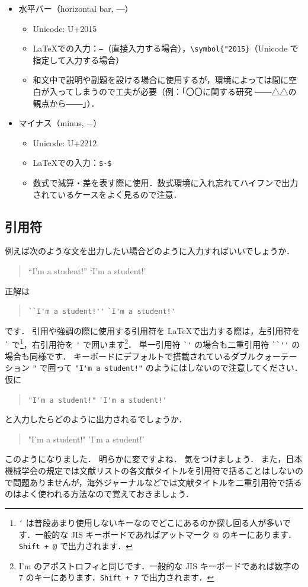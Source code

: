 \begin{itemize}
\begin{itemize}
    \end{itemize}
    \item 水平バー（horizontal bar, ―）
    \begin{itemize}
        \item Unicode: U+2015
        \item \LaTeX での入力：\verb|―|（直接入力する場合），\verb|\symbol{"2015}|（Unicode で指定して入力する場合）
        \item 和文中で説明や副題を設ける場合に使用するが，環境によっては間に空白が入ってしまうので工夫が必要（例：「〇〇に関する研究 ――△△の観点から――」）．
    \end{itemize}
    \item マイナス（minus, $-$）
    \begin{itemize}
        \item Unicode: U+2212
        \item \LaTeX での入力：\verb|$-$|
        \item 数式で減算・差を表す際に使用．数式環境に入れ忘れてハイフンで出力されているケースをよく見るので注意．
    \end{itemize}
\end{itemize}

\subsection*{引用符}
\label{ssec:quotation}

例えば次のような文を出力したい場合どのように入力すればいいでしょうか．
\begin{quotation}
    ``I'm a student!'' \qquad `I'm a student!'
\end{quotation}
正解は
\begin{quotation}
    \verb|``I'm a student!''| \qquad \verb|`I'm a student!'|
\end{quotation}
です．
引用や強調の際に使用する引用符を \LaTeX で出力する際は，左引用符を \verb|`| で\footnote{\texttt{`} は普段あまり使用しないキーなのでどこにあるのか探し回る人が多いです．一般的な JIS キーボードであればアットマーク @ のキーにあります．\texttt{Shift + @} で出力されます．}，右引用符を \verb|'| で囲います\footnote{I'm のアポストロフィと同じです．一般的な JIS キーボードであれば数字の 7 のキーにあります．\texttt{Shift + 7} で出力されます．}．
単一引用符 \verb|`'| の場合も二重引用符 \verb|``''| の場合も同様です．
キーボードにデフォルトで搭載されているダブルクォーテーション \verb|"| で囲って \verb|"I'm a student!"| のようにはしないので注意してください．
仮に
\begin{quotation}
    \verb|"I'm a student!"| \qquad \verb|'I'm a student!'|
\end{quotation}
と入力したらどのように出力されるでしょうか．
\begin{quotation}
    "I'm a student!" \qquad 'I'm a student!'
\end{quotation}
このようになりました．
明らかに変ですよね．
気をつけましょう．
また，日本機械学会の規定では文献リストの各文献タイトルを引用符で括ることはしないので問題ありませんが，海外ジャーナルなどでは文献タイトルを二重引用符で括るのはよく使われる方法なので覚えておきましょう．

